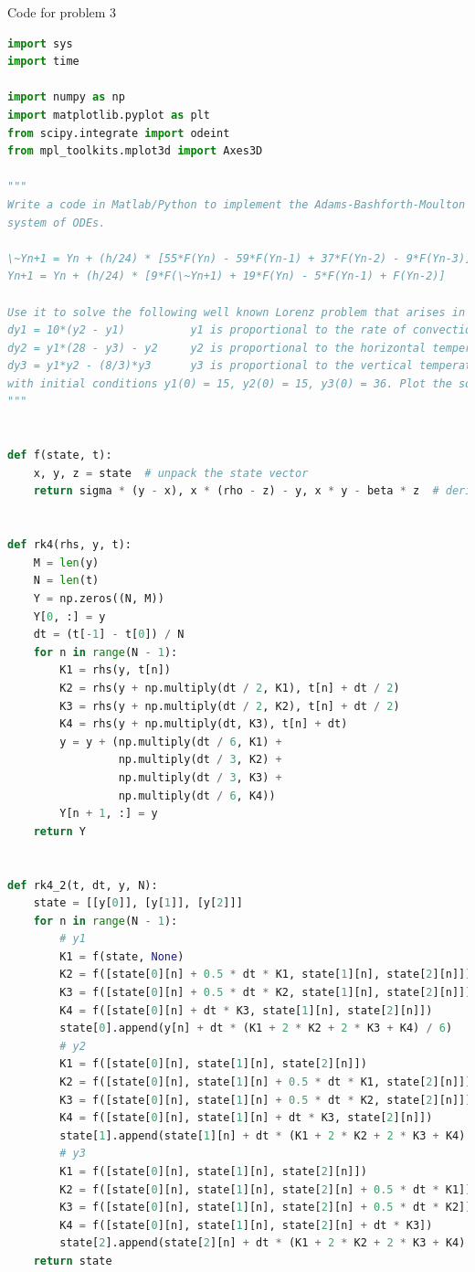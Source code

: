 \documentclass[11pt]{article}
\begin{document}
Code for problem 3
\begin{lstlisting}[language=Python]
import sys
import time

import numpy as np
import matplotlib.pyplot as plt
from scipy.integrate import odeint
from mpl_toolkits.mplot3d import Axes3D

"""
Write a code in Matlab/Python to implement the Adams-Bashforth-Moulton method of fourth order for the autonomous
system of ODEs.

\~Yn+1 = Yn + (h/24) * [55*F(Yn) - 59*F(Yn-1) + 37*F(Yn-2) - 9*F(Yn-3)]  -   Adams-Bashforth method
Yn+1 = Yn + (h/24) * [9*F(\~Yn+1) + 19*F(Yn) - 5*F(Yn-1) + F(Yn-2)]      -   Adams-Moulton method

Use it to solve the following well known Lorenz problem that arises in the study of dynamical systems
dy1 = 10*(y2 - y1)          y1 is proportional to the rate of convection
dy2 = y1*(28 - y3) - y2     y2 is proportional to the horizontal temperature variation
dy3 = y1*y2 - (8/3)*y3      y3 is proportional to the vertical temperature variation
with initial conditions y1(0) = 15, y2(0) = 15, y3(0) = 36. Plot the solution curves for 0 <= t <= 20.
"""


def f(state, t):
    x, y, z = state  # unpack the state vector
    return sigma * (y - x), x * (rho - z) - y, x * y - beta * z  # derivatives


def rk4(rhs, y, t):
    M = len(y)
    N = len(t)
    Y = np.zeros((N, M))
    Y[0, :] = y
    dt = (t[-1] - t[0]) / N
    for n in range(N - 1):
        K1 = rhs(y, t[n])
        K2 = rhs(y + np.multiply(dt / 2, K1), t[n] + dt / 2)
        K3 = rhs(y + np.multiply(dt / 2, K2), t[n] + dt / 2)
        K4 = rhs(y + np.multiply(dt, K3), t[n] + dt)
        y = y + (np.multiply(dt / 6, K1) +
                 np.multiply(dt / 3, K2) +
                 np.multiply(dt / 3, K3) +
                 np.multiply(dt / 6, K4))
        Y[n + 1, :] = y
    return Y


def rk4_2(t, dt, y, N):
    state = [[y[0]], [y[1]], [y[2]]]
    for n in range(N - 1):
        # y1
        K1 = f(state, None)
        K2 = f([state[0][n] + 0.5 * dt * K1, state[1][n], state[2][n]])
        K3 = f([state[0][n] + 0.5 * dt * K2, state[1][n], state[2][n]])
        K4 = f([state[0][n] + dt * K3, state[1][n], state[2][n]])
        state[0].append(y[n] + dt * (K1 + 2 * K2 + 2 * K3 + K4) / 6)
        # y2
        K1 = f([state[0][n], state[1][n], state[2][n]])
        K2 = f([state[0][n], state[1][n] + 0.5 * dt * K1, state[2][n]])
        K3 = f([state[0][n], state[1][n] + 0.5 * dt * K2, state[2][n]])
        K4 = f([state[0][n], state[1][n] + dt * K3, state[2][n]])
        state[1].append(state[1][n] + dt * (K1 + 2 * K2 + 2 * K3 + K4) / 6)
        # y3
        K1 = f([state[0][n], state[1][n], state[2][n]])
        K2 = f([state[0][n], state[1][n], state[2][n] + 0.5 * dt * K1])
        K3 = f([state[0][n], state[1][n], state[2][n] + 0.5 * dt * K2])
        K4 = f([state[0][n], state[1][n], state[2][n] + dt * K3])
        state[2].append(state[2][n] + dt * (K1 + 2 * K2 + 2 * K3 + K4) / 6)
    return state



\end{lstlisting}
\end{document}
